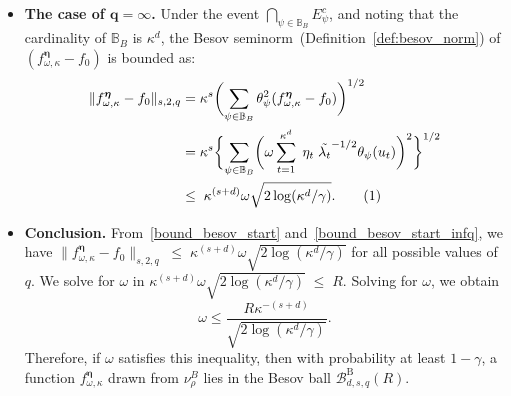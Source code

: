 \documentclass[twoside,11pt]{article}
\newcommand\numberthis{\addtocounter{equation}{1}\tag{\theequation}}
\newcommand{\dimDensity}{d} %
\newcommand{\smoothness}{s}
\newcommand{\ballRadius}{R}
\newcommand{\ONset}{\mathbb{B}}
\newcommand{\maxErrorTypeOne}{\gamma} %
\newcommand{\binNum}{\kappa}           %
\newcommand{\coef}{\theta}
\newcommand{\besovParamMicroscope}{q}
\newcommand{\ballDistn}{\mathcal{B}}
\newcommand{\besovBall}[2]{\ballDistn_{\dimDensity,\smoothness, #2}^{\mathrm{B}}(\ballRadius)}
\begin{document}
\begin{appendix}
\begin{itemize}
	\item \textbf{The case of $\mathbf{ \besovParamMicroscope = }\boldsymbol{\infty}$.}
	Under the event $\bigcap_{\psi \in \ONset_B} E_{\psi}^c$, and noting that the cardinality of $\ONset_B$ is $\binNum^\dimDensity$,
	the Besov seminorm~(Definition~\ref{def:besov_norm}) of $(
	f^{{\boldsymbol{\eta}}}_{\omega, \binNum}
	-
	f_0
	)$ is bounded as: 
	\begin{align*}
		\|f^{{\boldsymbol{\eta}}}_{\omega, \binNum}
		-
		f_0\|_{
			\smoothness,
			2,
			\besovParamMicroscope
		}
		& =
		\binNum^{\smoothness}
		\biggl(
		\sum_{
			\psi
			\in 
			\ONset_{B}
		}
		\coef^2_{\psi}
		(
		f^{{\boldsymbol{\eta}}}_{\omega, \binNum}
		-
		f_0
		)
		\biggr)^{1/2}
		\\&=
		\binNum^{\smoothness }
		\biggl\{
		\sum_{
			\psi
			\in 
			\ONset_{B}
		}
		\biggl(
		\omega
		\sum_{t=1}^{\binNum^{\dimDensity}}
		\; \eta_t \;\tilde{\lambda_t}^{-1/2}
		\coef_{\psi}(u_t)
		\biggr)^2
		\biggr\}^{1/2}
		\\&\leq
		\;
		\binNum^{(\smoothness + \dimDensity)}
		\omega
		\sqrt{
			2\log(\binNum^\dimDensity/\maxErrorTypeOne)
		}.
		\numberthis
		\label{bound_besov_start_infq}
	\end{align*}
	\item \textbf{Conclusion.} 
	From~\eqref{bound_besov_start} and~\eqref{bound_besov_start_infq},
	we have
	$
	\|f^{{\boldsymbol{\eta}}}_{\omega, \binNum}
	-
	f_0\|_{
		\smoothness,
		2,
		\besovParamMicroscope
	}
	\;
	\leq
	\;
	\binNum^{(\smoothness + \dimDensity)}
	\omega
	\sqrt{
		2\log(\binNum^\dimDensity/\maxErrorTypeOne)
	}
	$
	for all possible values of $\besovParamMicroscope$.
	We solve for \(\omega\) in
	$
	\binNum^{(\smoothness + \dimDensity)}
	\omega
	\sqrt{
		2\log(\binNum^\dimDensity/\maxErrorTypeOne)
	}
	\;
	\leq
	\;
	\ballRadius.
	$
	Solving for $\omega$, we obtain
	\begin{equation}
		\omega \leq
		\frac{\ballRadius \binNum^{-(\smoothness + \dimDensity)}}{
			\sqrt{
				2\log(\binNum^\dimDensity/\maxErrorTypeOne)
			}
		}.
	\end{equation}
	Therefore, if \(\omega\) satisfies this inequality, then with probability at least \(1 - \gamma\),  a function \(f^{{\boldsymbol{\eta}}}_{\omega, \binNum}\) drawn from \(\nu_\rho^B\) lies in the Besov ball $\besovBall{}{\besovParamMicroscope}$.
	\end{itemize}

\end{appendix}
\end{document}
